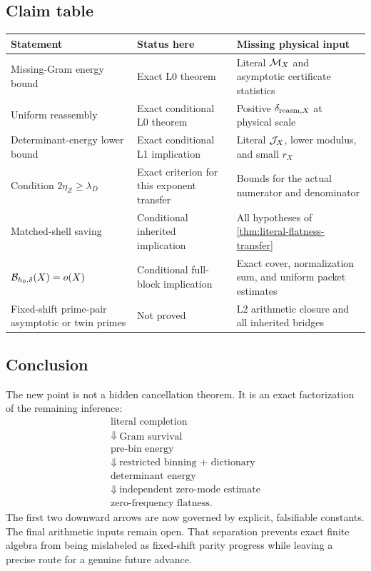 \subsection{Claim table}

\begin{center}
\small
\begin{tabular}{@{}>{\raggedright\arraybackslash}p{}
                    >{\raggedright\arraybackslash}p{}
                    >{\raggedright\arraybackslash}p{}@{}}
\toprule
Statement & Status here & Missing physical input\\
\midrule
Missing-Gram energy bound
& Exact L0 theorem
& Literal \(\mathcal M_X\) and asymptotic certificate statistics\\
\addlinespace
Uniform reassembly
& Exact conditional L0 theorem
& Positive \(\delta_{{\rm reasm},X}\) at physical scale\\
\addlinespace
Determinant-energy lower bound
& Exact conditional L1 implication
& Literal \(\mathcal J_X\), lower modulus, and small \(r_X\)\\
\addlinespace
Condition \(2\eta_Z\ge\lambda_D\)
& Exact criterion for this exponent transfer
& Bounds for the actual numerator and denominator\\
\addlinespace
Matched-shell saving
& Conditional inherited implication
& All hypotheses of \cref{thm:literal-flatness-transfer}\\
\addlinespace
\(\mathcal B_{h_0,\delta}(X)=o(X)\)
& Conditional full-block implication
& Exact cover, normalization sum, and uniform packet estimates\\
\addlinespace
Fixed-shift prime-pair asymptotic or twin primes
& Not proved
& L2 arithmetic closure and all inherited bridges\\
\bottomrule
\end{tabular}
\end{center}

\subsection{Conclusion}

The new point is not a hidden cancellation theorem.  It is an exact
factorization of the remaining inference:
\[
\boxed{
\begin{array}{c}
\text{literal completion}\\
\Downarrow\ \text{Gram survival}\\
\text{pre-bin energy}\\
\Downarrow\ \text{restricted binning + dictionary}\\
\text{determinant energy}\\
\Downarrow\ \text{independent zero-mode estimate}\\
\text{zero-frequency flatness}.
\end{array}}
\]
The first two downward arrows are now governed by explicit,
falsifiable constants.  The final arithmetic inputs remain open.
That separation prevents exact finite algebra from being mislabeled
as fixed-shift parity progress while leaving a precise route for a
genuine future advance.
